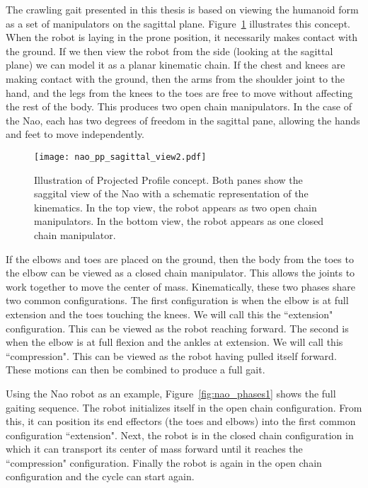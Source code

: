 The crawling gait presented in this thesis is based on viewing the humanoid form as a set of manipulators on the
sagittal plane. Figure~\ref{fig:nao_sideview1} illustrates this concept.
When the robot is laying in the prone position, it necessarily makes contact with the ground. If we then view the robot
from the side (looking at the sagittal plane) we can model it as a planar kinematic chain. If the chest and knees
are making contact with the ground, then the arms from the shoulder joint to the hand, and the legs from the knees to the
toes are free to move without affecting the rest of the body. This produces two open chain manipulators. In the case of the Nao, each has two degrees
of freedom in the sagittal pane, allowing the hands and feet to move independently.
\begin{figure}
	\centering
	\texttt{[image: nao\_pp\_sagittal\_view2.pdf]}
	\caption
	{Illustration of Projected Profile concept. Both panes show the saggital view of the Nao with a schematic representation of the kinematics. 
	In the top view, the robot appears as two open chain manipulators. In the bottom view, the robot appears as one closed chain manipulator.}
	\label{fig:nao_sideview1}
\end{figure}

If the elbows and toes are placed on the ground, then the body from the toes to the elbow can be viewed as a closed chain manipulator.
This allows the joints to work together to move the center of mass. Kinematically, these two phases share two common configurations.
The first configuration is when the elbow is at full extension and the toes touching the knees. We will call this the ``extension" configuration.
This can be viewed as the robot reaching forward. The second is when the elbow is at full flexion and the ankles at extension.
We will call this ``compression".
This can be viewed as the robot having pulled itself forward. These motions can then be combined
to produce a full gait.

Using the Nao robot as an example, Figure~\ref{fig:nao_phases1} shows the full gaiting sequence.
The robot initializes itself in the open chain configuration. From this, it can position
its end effectors (the toes and elbows) into the first common configuration ``extension". Next, the robot is in the closed chain 
configuration in which it can transport its center of mass forward until it reaches the ``compression" configuration. Finally the robot
is again in the open chain configuration and the cycle can start again.

